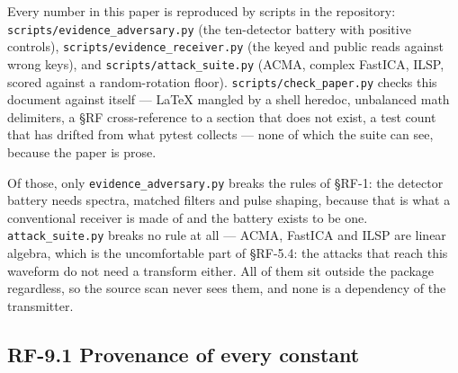 \documentclass[10pt,letterpaper,twocolumn]{article}
\begin{document}
Every number in this paper is reproduced by scripts in the repository: \texttt{scripts/\allowbreak{}evidence\_\allowbreak{}adversary.\allowbreak{}py} (the ten-detector battery with positive controls), \texttt{scripts/\allowbreak{}evidence\_\allowbreak{}receiver.\allowbreak{}py} (the keyed and public reads against wrong keys), and \texttt{scripts/\allowbreak{}attack\_\allowbreak{}suite.\allowbreak{}py} (ACMA, complex FastICA, ILSP, scored against a random-rotation floor). \texttt{scripts/\allowbreak{}check\_\allowbreak{}paper.\allowbreak{}py} checks this document against itself --- LaTeX mangled by a shell heredoc, unbalanced math delimiters, a §RF cross-reference to a section that does not exist, a test count that has drifted from what pytest collects --- none of which the suite can see, because the paper is prose.

Of those, only \texttt{evidence\_\allowbreak{}adversary.\allowbreak{}py} breaks the rules of §RF-1: the detector battery needs spectra, matched filters and pulse shaping, because that is what a conventional receiver is made of and the battery exists to be one. \texttt{attack\_\allowbreak{}suite.\allowbreak{}py} breaks no rule at all --- ACMA, FastICA and ILSP are linear algebra, which is the uncomfortable part of §RF-5.4: the attacks that reach this waveform do not need a transform either. All of them sit outside the package regardless, so the source scan never sees them, and none is a dependency of the transmitter.

\subsection{RF-9.1 Provenance of every constant}\label{rf-91-provenance-of-every-constant}
\end{document}
